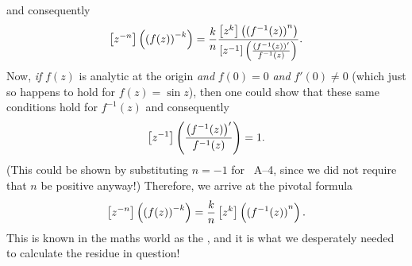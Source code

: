 and consequently
\[
    \left[ z^{-n} \right] \left( {(f(z))}^{-k} \right)
    = \frac{k}{n} \frac{\left[ z^{k} \right] \left( {(f^{-1} (z))}^n \right)}{
        \left[ z^{-1} \right] \left( \frac{{\left( f^{-1} (z) \right)}'}{f^{-1} (z)} \right)
    }.
\]
Now, \emph{if} $f(z)$ is analytic at the origin \emph{and} $f(0) = 0$ \emph{and} $f'(0) \neq 0$
(which just so happens to hold for $f(z) = \sin z$),
then one could show that these same conditions hold for $f^{-1} (z)$ and consequently
\[
    \left[ z^{-1} \right] \left( \frac{{\left( f^{-1} (z) \right)}'}{f^{-1} (z)} \right) = 1.
\]
(This could be shown by substituting $n = -1$ for ~A--4,
since we did not require that $n$ be positive anyway!)
Therefore, we arrive at the pivotal formula
\[
    \left[ z^{-n} \right] \left( {(f(z))}^{-k} \right) = \frac{k}{n} \left[ z^{k} \right] \left( {(f^{-1} (z))}^n \right).
\]
This is known in the maths world as the
,
and it is what we desperately needed to calculate the residue in question!

